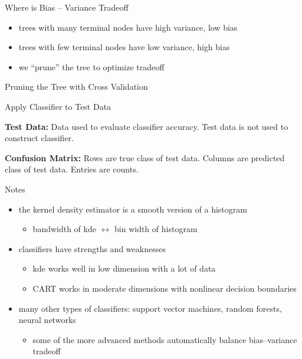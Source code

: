 \documentclass[12pt]{beamer}
\begin{document}
\begin{frame}{Where is Bias -- Variance Tradeoff}

  \begin{itemize}
  \item trees with many terminal nodes have high variance, low bias
  \item trees with few terminal nodes have low variance, high bias
  \item we ``prune'' the tree to optimize tradeoff
  \end{itemize}
  
\end{frame}

\begin{frame}{Pruning the Tree with Cross Validation}

\end{frame}



\begin{frame}{Apply Classifier to Test Data}

\textbf{Test Data:} Data used to evaluate classifier accuracy. Test data is not used to construct classifier.

\vspace{.1in}

\textbf{Confusion Matrix:} Rows are true class of test data. Columns are predicted class of test data. Entries are counts.

\vspace{.2in}

\begin{center}

\end{center}

\end{frame}


\begin{frame}{Notes}
  \begin{itemize}
  \item the kernel density estimator is a smooth version of a histogram
    \begin{itemize}
    \item bandwidth of kde $\leftrightarrow$ bin width of histogram
    \end{itemize}
  \item classifiers have strengths and weaknesses
    \begin{itemize}
    \item kde works well in low dimension with a lot of data
    \item CART works in moderate dimensions with nonlinear decision boundaries
    \end{itemize}
  \item many other types of classifiers: support vector machines, random forests, neural networks
    \begin{itemize}
    \item some of the more advanced methods automatically balance bias--variance tradeoff
    \end{itemize}
  \end{itemize}
\end{frame}
\end{document}
